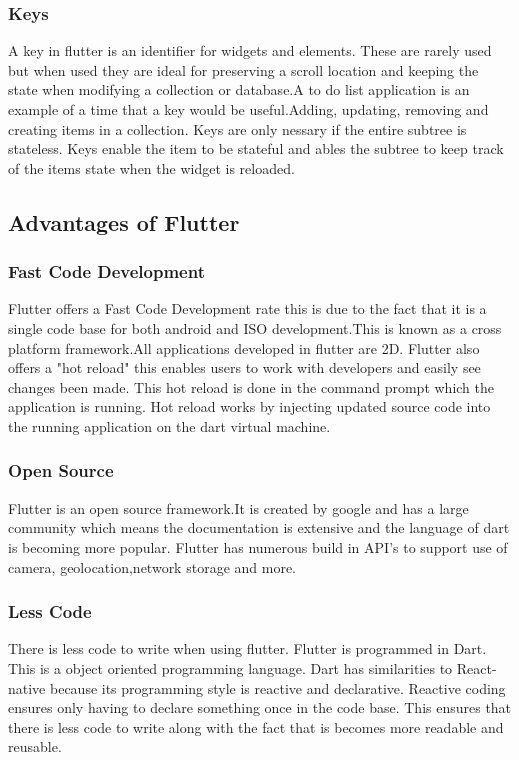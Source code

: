 \subsubsection{Keys}
A key in flutter is an identifier for widgets and elements. These are rarely used but when used they are ideal for preserving a scroll location and keeping the state when modifying a collection or database.\cite{key_widgets}A to do list application is an example of a time that a key would be useful.Adding, updating, removing and creating items in a collection. Keys are only nessary if the entire subtree is stateless. Keys enable the item to be stateful and ables the subtree to keep track of the items state when the widget is reloaded. \cite{keys}

\subsection{Advantages of Flutter}

\subsubsection{Fast Code Development}
Flutter offers a Fast Code Development rate this is due to the fact that it is a single code base for both android and ISO development.This is known as a cross platform framework.All applications developed in flutter are 2D. Flutter also offers a "hot reload" this enables users to work with developers and easily see changes been made. This hot reload is done in the command prompt which the application is running. Hot reload works by injecting updated source code into the running application on the dart virtual machine.\cite{faq_2019}
\subsubsection{Open Source}
Flutter is an open source framework.It is created by google and has a large community which means the documentation is extensive and the language of dart is becoming more popular. Flutter has numerous build in API's to support use of camera, geolocation,network storage and more.\cite{pros_cons}
\subsubsection{Less Code}
There is less code to write when using flutter. Flutter is programmed in Dart. This is a object oriented programming language. Dart has similarities to React-native because its programming style is reactive and declarative.\cite{pros_cons} Reactive coding ensures only having to declare something once in the code base. This ensures that there is less code to write along with the fact that is becomes more readable and reusable.\cite{depth_flutter_2019}
